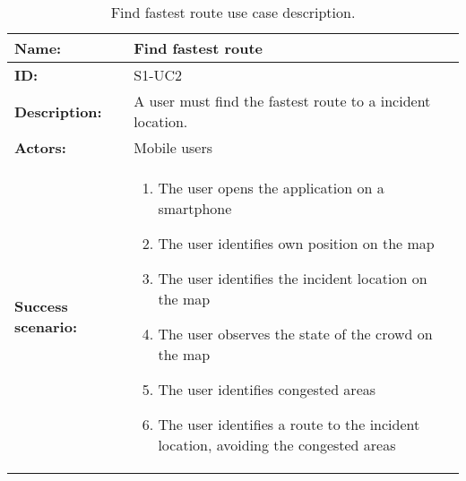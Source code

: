 \begin{table}[htbp]
    \centering
    \begin{tabularx}{\textwidth}{l X}
        \toprule
        \textbf{Name:}  & Find fastest route \\ \midrule
        \textbf{ID:}    & S1-UC2\\ \midrule
        \textbf{Description:} & A user must find the fastest route to a incident location. \\ \midrule
        \textbf{Actors:} & Mobile users \\ \midrule
        \textbf{Success scenario:} & 
        \begin{enumerate}
            \item The user opens the application on a smartphone
            \item The user identifies own position on the map
            \item The user identifies the incident location on the map
            \item The user observes the state of the crowd on the map
            \item The user identifies congested areas
            \item The user identifies a route to the incident location, avoiding the congested areas
        \end{enumerate}
        \\
        \bottomrule
    \end{tabularx}
    \caption{Find fastest route use case description.}
    \label{tab:s1-uc2}
\end{table}